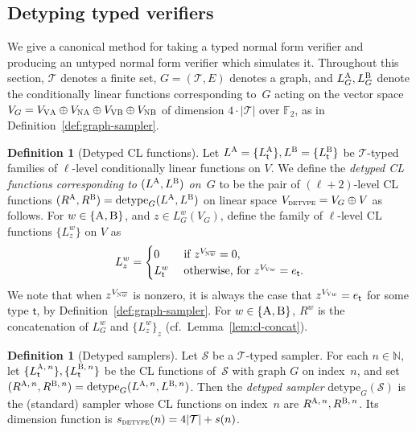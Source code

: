 \documentclass[11pt]{article}
\theoremstyle{definition}
\newtheorem{definition}[theorem]{Definition}
\newcommand{\N}{\ensuremath{\mathbb{N}}}
\newcommand{\F}{\ensuremath{\mathbb{F}}}
\newcommand{\sampler}{\mathcal{S}}
\newcommand{\detype}{\mathrm{detype}}
\newcommand{\type}{\mathcal{T}}
\newcommand{\gamestyle}[1]{\ensuremath{\textsc{#1}}\xspace}
\newcommand{\labelstyle}[1]{\ensuremath{\textsc{#1}}\xspace}
\newcommand{\vertex}[1]{\labelstyle{V#1}}
\newcommand{\edge}[1]{\labelstyle{N#1}}
\newcommand{\tvarstyle}[1]{\mathsf{#1}}
\newcommand{\tvar}{\ensuremath{\tvarstyle{t}}}
\newcommand{\alice}{\labelstyle{A}}
\newcommand{\bob}{\labelstyle{B}}
\begin{document}
\subsection{Detyping typed verifiers}
\label{sec:detype}  

We give a canonical method for taking a typed normal form verifier and producing
an untyped normal form verifier which simulates it.
Throughout this section, $\type$ denotes a finite set, $G = (\type, E)$ denotes
a graph, and $L_G^\alice, L_G^\bob$ denote the conditionally linear functions
corresponding to~$G$ acting on the vector space $V_G = V_{\vertex{\alice}}
\oplus V_{\edge{\alice}} \oplus V_{\vertex{\bob}} \oplus V_{\edge{\bob}}$ of
dimension $4\cdot |\type|$ over $\F_2$, as in
Definition~\ref{def:graph-sampler}.

\begin{definition}[Detyped CL functions]
  \label{def:detyped-CL}
  Let $L^\alice = \{L^{\alice}_{\tvar}\}, L^\bob = \{L^{\bob}_{\tvar}\}$ be
  $\type$-typed families of $\ell$-level conditionally linear functions on $V$.
  We define the \emph{detyped CL functions corresponding to $(L^\alice, L^\bob)$
    on~$G$} to be the pair of $(\ell+2)$-level CL functions $(R^\alice, R^\bob)
  = \detype_G(L^\alice, L^\bob)$ on linear space $V_{\gamestyle{detype}} = V_G
  \oplus V$ as follows.
  For $w \in \{\alice, \bob\}$, and $z \in L^w_G (V_G)$, define the family of
  $\ell$-level CL functions $\{L^w_z\}$ on $V$ as
  \begin{equation*}
    L^w_z =
    \begin{cases}
      0 & \text{ if } z^{V_{\edge{}\overline{w}}} = 0,\\
      L^w_\tvar & \text { otherwise, for } z^{V_{\vertex{}w}} = e_\tvar.
    \end{cases}
  \end{equation*}
  We note that when $z^{V_{\edge{}\overline{w}}}$ is nonzero, it is always the
  case that $z^{V_{\vertex{}w}} = e_\tvar$ for some type $\tvar$, by Definition~\ref{def:graph-sampler}.
  For $w\in \{\alice, \bob\}$, $R^w$ is the concatenation of $L^w_G$ and
  $\{L^w_z\}_z$ (cf.\ Lemma~\ref{lem:cl-concat}).
\end{definition}

\begin{definition}[Detyped samplers]
  Let $\sampler$ be a $\type$-typed sampler.
  For each $n \in \N$, let $\{L^{\alice,\, n}_\tvar\},  \{L^{\bob,\, n}_\tvar\}$
  be the CL functions of~$\sampler$ with graph $G$ on index~$n$, and set
  $(R^{\alice,\, n}, R^{\bob,\, n}) = \detype_G(L^{\alice,\, n}, L^{\bob,\,
    n})$.
  Then the \emph{detyped sampler} $\detype_G(\sampler)$ is the (standard)
  sampler whose CL functions on index~$n$ are $R^{\alice,\, n}, R^{\bob,\, n}$.
  Its dimension function is $s_{\gamestyle{detype}}(n) = 4|\type|+s(n)$.
\end{definition}
\end{document}
